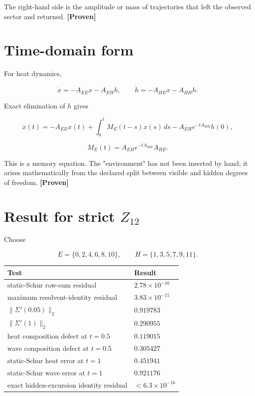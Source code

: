 \documentclass[11pt,a4paper,openany]{report}
\newcommand{\statusProven}{\textcolor{fingreen}{[Proven]}}
\begin{document}
The right-hand side is the amplitude or mass of trajectories that left the observed sector and returned. \textbf{\statusProven{}}

\section{Time-domain form}

For heat dynamics,

\[
\dot x=-A_{EE}x-A_{EH}h,\qquad
\dot h=-A_{HE}x-A_{HH}h.
\]

Exact elimination of \(h\) gives

\[
\dot x(t)
=-A_{EE}x(t)
+\int_0^t M_E(t-s)x(s)\,ds
-A_{EH}e^{-tA_{HH}}h(0),
\]

\[
M_E(t)=A_{EH}e^{-tA_{HH}}A_{HE}.
\]

This is a memory equation. The "environment" has not been inserted by hand; it arises mathematically from the declared split between visible and hidden degrees of freedom. \textbf{\statusProven{}}

\section{\texorpdfstring{Result for strict \(Z_{12}\)}{Result for strict Z\_12}}

Choose

\[
E=\{0,2,4,6,8,10\},\qquad
H=\{1,3,5,7,9,11\}.
\]

\begin{center}
\begingroup\small
\setlength{\tabcolsep}{2.5pt}
\renewcommand{\arraystretch}{1.16}
\begin{longtable}{@{}p{}p{}@{}}
\toprule
\textbf{Test} & \textbf{Result} \\
\midrule
\endhead
static-Schur row-sum residual & \(2.78\times10^{-16}\) \\
maximum resolvent-identity residual & \(3.83\times10^{-15}\) \\
\(\|\Sigma'(0.05)\|_2\) & \(0.919783\) \\
\(\|\Sigma'(1)\|_2\) & \(0.290955\) \\
heat composition defect at \(t=0.5\) & \(0.119015\) \\
wave composition defect at \(t=0.5\) & \(0.305427\) \\
static-Schur heat error at \(t=1\) & \(0.451941\) \\
static-Schur wave error at \(t=1\) & \(0.921176\) \\
exact hidden-excursion identity residual & \(<6.3\times10^{-16}\) \\
\bottomrule
\end{longtable}
\endgroup
\end{center}
\end{document}
